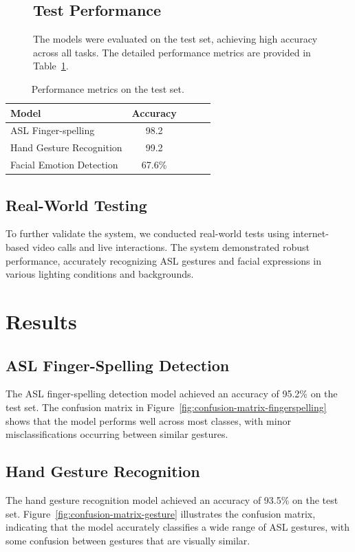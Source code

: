 \documentclass{article}
\begin{document}
\begin{figure}[h]

  \subsection{Test Performance}
  The models were evaluated on the test set, achieving high accuracy across all tasks. The detailed performance metrics are provided in Table~\ref{tab:performance-metrics}.
\end{figure}
\begin{table}[h]
  \centering
  \caption{Performance metrics on the test set.}
  \label{tab:performance-metrics}
  \begin{tabular}{lcccc}
    \hline %
    Model & Accuracy \\
    \hline
    ASL Finger-spelling & 98.2 \\
    Hand Gesture Recognition & 99.2 \\
    Facial Emotion Detection & 67.6\%  \\
    \hline
  \end{tabular}
\end{table}

\subsection{Real-World Testing}
To further validate the system, we conducted real-world tests using internet-based video calls and live interactions. The system demonstrated robust performance, accurately recognizing ASL gestures and facial expressions in various lighting conditions and backgrounds.

\section{Results}
\subsection{ASL Finger-Spelling Detection}
The ASL finger-spelling detection model achieved an accuracy of 95.2\% on the test set. The confusion matrix in Figure~\ref{fig:confusion-matrix-fingerspelling} shows that the model performs well across most classes, with minor misclassifications occurring between similar gestures.

\subsection{Hand Gesture Recognition}
The hand gesture recognition model achieved an accuracy of 93.5\% on the test set. Figure~\ref{fig:confusion-matrix-gesture} illustrates the confusion matrix, indicating that the model accurately classifies a wide range of ASL gestures, with some confusion between gestures that are visually similar.
\end{document}
